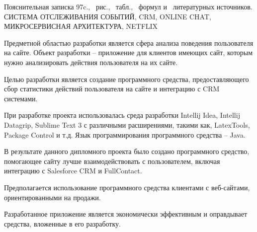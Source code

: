 \thispagestyle{empty}


\begin{center}
Пояснительная записка 97c., \totfig{}~рис., \tottab{}~табл., \toteq{}~формул и \totref{}~литературных источников.\\
СИСТЕМА ОТСЛЕЖИВАНИЯ СОБЫТИЙ, CRM, ONLINE CHAT, МИКРОСЕРВИСНАЯ АРХИТЕКТУРА, NETFLIX
\end{center}

Предметной областью разработки является сфера анализа поведения пользователя на сайте. Объект разработки -- приложение для клиентов имеющих сайт, которым нужно анализировать действия пользователя на их сайте.

Целью разработки является создание программного средства, предоставляющего сбор статистики действий пользователя на сайте и интеграцию с CRM системами.

При разработке проекта использовалась среда разработки Intellij Idea, Intellij Datagrip, Sublime Text 3 с различными расширениями, такими как, LatexTools, Package Control и т.д. Язык программирования программного средства -- Java.

В результате данного дипломного проекта было создано программного средство, помогающее сайту лучше взаимодействовать с пользователем, включая интеграцию с Salesforce CRM и FullContact.

Предполагается использование программного средства клиентами с веб-сайтами, ориентированными на продажи.

Разработанное приложение является экономически эффективным и оправдывает средства, вложенные в его разработку.

\clearpage

